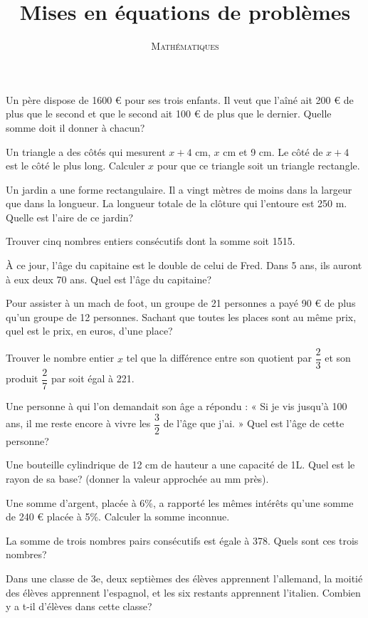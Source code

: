 \documentclass[a4paper,12pt]{scrartcl}
\date{}
\title{Mises en équations de problèmes}
\author{\textsc{Mathématiques}}
\begin{document}
\maketitle


\exo{}
Un père dispose de 1600 € pour ses trois enfants. Il veut que l'aîné ait 200 € de plus que le second et que le second ait 100 € de plus que le dernier.
Quelle somme doit il donner à chacun? 

\exo{}
Un triangle a des côtés qui mesurent $x + 4$ cm, $x$ cm et 9 cm.
Le côté de $x + 4$ est le côté le plus long.
Calculer $x$ pour que ce triangle soit un triangle rectangle. 

\exo{}
Un jardin a une forme rectangulaire. Il a vingt mètres de moins dans la largeur que dans la longueur. La longueur totale de la clôture qui l'entoure est 250 m.
Quelle est l'aire de ce jardin? 

\exo{}
Trouver cinq nombres entiers consécutifs dont la somme soit 1515. 

\exo{}
À ce jour, l'âge du capitaine est le double de celui de Fred. Dans 5 ans, ils auront à eux deux 70 ans. Quel est l'âge du capitaine? 

\exo{}
Pour assister à un mach de foot, un groupe de 21 personnes a payé 90 € de plus qu'un groupe de 12 personnes.
Sachant que toutes les places sont au même prix, quel est le prix, en euros, d'une place?

\exo{}
Trouver le nombre entier $x$ tel que la différence entre son quotient par $\dfrac{2}{3}$ et son produit $\dfrac{2}{7}$ par soit égal à 221.

\exo{}
Une personne à qui l'on demandait son âge a répondu :
« Si je vis jusqu'à 100 ans, il me reste encore à vivre les $\dfrac{3}{2}$ de l'âge que j'ai. » Quel est l'âge de cette personne? 

\exo{}
Une bouteille cylindrique de 12 cm de hauteur a une capacité de 1L.
Quel est le rayon de sa base? (donner la valeur approchée au mm près). 

\exo{}
Une somme d'argent, placée à 6\%, a rapporté les mêmes intérêts qu'une somme de 240 € placée à 5\%. Calculer la somme inconnue. 

\exo{}
La somme de trois nombres pairs consécutifs est égale à 378.
Quels sont ces trois nombres? 

\exo{}
Dans une classe de 3e, deux septièmes des élèves apprennent l'allemand, la moitié des élèves apprennent l'espagnol, et les six restants apprennent l'italien.
Combien y a t-il d'élèves dans cette classe? 
\end{document}
